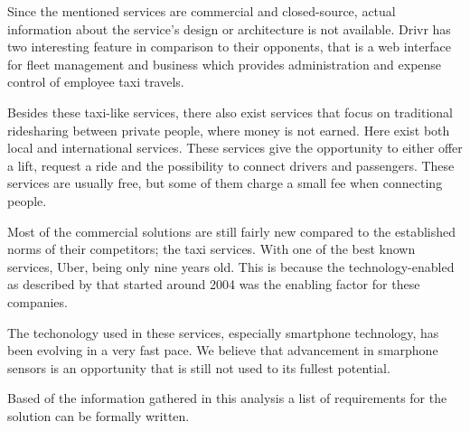 Since the mentioned services are commercial and closed-source, actual information about the service's design or architecture is not available.
Drivr has two interesting feature in comparison to their opponents, that is a web interface for fleet management and business which provides administration and expense control of employee taxi travels.

Besides these taxi-like services, there also exist services that focus on traditional ridesharing between private people, where money is not earned.
Here exist both local and international services. 
These services give the opportunity to either offer a lift, request a ride and the possibility to connect drivers and passengers.
These services are usually free, but some of them charge a small fee when connecting people.

Most of the commercial solutions are still fairly new compared to the established norms of their competitors; the taxi services.
With one of the best known services, Uber, being only nine years old.
This is because the technology-enabled as described by \citet{doi:10.1080/01441647.2011.621557} that started around 2004 was the enabling factor for these companies.

The techonology used in these services, especially smartphone technology, has been evolving in a very fast pace.
We believe that advancement in smarphone sensors is an opportunity that is still not used to its fullest potential.

Based of the information gathered in this analysis a list of requirements for the solution can be formally written.
